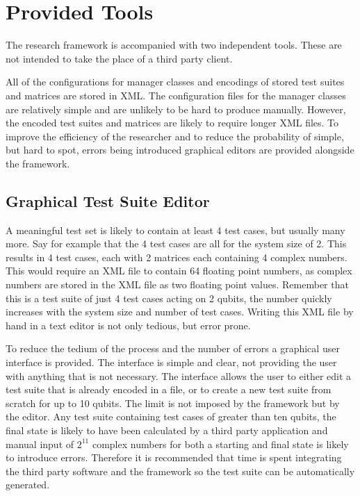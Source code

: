 \section{Provided Tools}
The research framework is accompanied with two independent tools.
These are not intended to take the place of a third party client.

All of the configurations for manager classes and encodings of stored test suites and matrices are stored in XML.
The configuration files for the manager classes are relatively simple and are unlikely to be hard to produce manually.
However, the encoded test suites and matrices are likely to require longer XML files.
To improve the efficiency of the researcher and to reduce the probability of simple, but hard to spot, errors being introduced graphical editors are provided alongside the framework.

\subsection{Graphical Test Suite Editor}
\label{sec:indtestsuiteeditor}
A meaningful test set is likely to contain at least 4 test cases, but usually many more.
Say for example that the 4 test cases are all for the system size of 2.
This results in 4 test cases, each with 2 matrices each containing 4 complex numbers.
This would require an XML file to contain 64 floating point numbers, as complex numbers are stored in the XML file as two floating point values.
Remember that this is a test suite of just 4 test cases acting on 2 qubits, the number quickly increases with the system size and number of test cases.
Writing this XML file by hand in a text editor is not only tedious, but error prone.

To reduce the tedium of the process and the number of errors a graphical user interface is provided.
The interface is simple and clear, not providing the user with anything that is not necessary.
The interface allows the user to either edit a test suite that is already encoded in a file, or to create a new test suite from scratch for up to 10 qubits.
The limit is not imposed by the framework but by the editor.
Any test suite containing test cases of greater than ten qubits, the final state is likely to have been calculated by a third party application and manual input of $2^{11}$ complex numbers for both a starting and final state is likely to introduce errors.
Therefore it is recommended that time is spent integrating the third party software and the framework so the test suite can be automatically generated.

